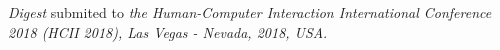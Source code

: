 \label{ap:C}

\textit{Digest} submited to \textit{the Human-Computer Interaction International Conference 2018 (HCII 2018), Las Vegas - Nevada, 2018, USA}.

